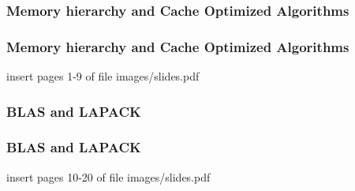 \documentclass[smaller,a4paper,allowframebreaks]{beamer}
\begin{document}
\begin{frame}
\frametitle{Memory hierarchy and Cache Optimized Algorithms}
\end{frame}

\begin{frame}
\frametitle{Memory hierarchy and Cache Optimized Algorithms}
insert pages 1-9 of file images/slides.pdf
\end{frame}

\begin{frame}
\frametitle{BLAS and LAPACK}
\end{frame}

\begin{frame}
\frametitle{BLAS and LAPACK}
insert pages 10-20 of file images/slides.pdf
\end{frame}
\end{document}
